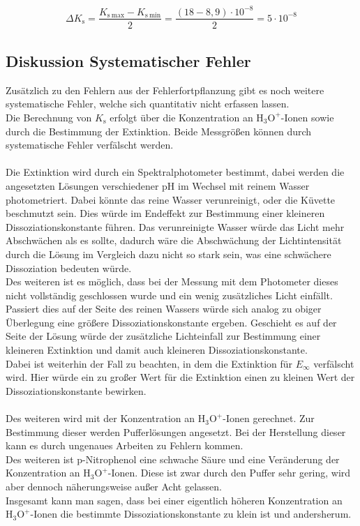\documentclass[12pt,a4paper,titlepage,headinclude,bibtotoc]{scrartcl}
\begin{document}
\begin{align}
\Delta K_{\mathrm{s}} = \dfrac{K_{\mathrm{s{~}max}}-K_{\mathrm{s{~}min}}}{2} = \dfrac{(18-8,9) \cdot 10^{-8}}{2}= 5\cdot 10^{-8}
\end{align}


\newpage
\subsection{Diskussion Systematischer Fehler}
Zusätzlich zu den Fehlern aus der Fehlerfortpflanzung gibt es noch weitere systematische Fehler, welche sich quantitativ nicht erfassen lassen.\\
Die Berechnung von $K_{\mathrm{s}}$ erfolgt über die Konzentration an $\mathrm{H_3 O^+}$-Ionen sowie durch die Bestimmung der Extinktion. Beide Messgrößen können durch systematische Fehler verfälscht werden.\\\\
Die Extinktion wird durch ein Spektralphotometer bestimmt, dabei werden die angesetzten Lösungen verschiedener pH im Wechsel mit reinem Wasser photometriert. Dabei könnte das reine Wasser verunreinigt, oder die Küvette beschmutzt sein. Dies würde im Endeffekt zur Bestimmung einer kleineren Dissoziationskonstante führen. Das verunreinigte Wasser würde das Licht mehr Abschwächen als es sollte, dadurch wäre die Abschwächung der Lichtintensität durch die Lösung im Vergleich dazu nicht so stark sein, was eine schwächere Dissoziation bedeuten würde.\\ Des weiteren ist es möglich, dass bei der Messung mit dem Photometer dieses nicht vollständig geschlossen wurde und ein wenig zusätzliches Licht einfällt. Passiert dies auf der Seite des reinen Wassers würde sich analog zu obiger Überlegung eine größere Dissoziationskonstante ergeben. Geschieht es auf der Seite der Lösung würde der zusätzliche Lichteinfall zur Bestimmung einer kleineren Extinktion und damit auch kleineren Dissoziationskonstante.\\ Dabei ist weiterhin der Fall zu beachten, in dem die Extinktion für $E_{\infty}$ verfälscht wird. Hier würde ein zu großer Wert für die Extinktion einen zu kleinen Wert der Dissoziationskonstante bewirken.\\\\
Des weiteren wird mit der Konzentration an $\mathrm{H_3 O^+}$-Ionen gerechnet. Zur Bestimmung dieser werden Pufferlösungen angesetzt. Bei der Herstellung dieser kann es durch ungenaues Arbeiten zu Fehlern kommen.\\ 
Des weiteren ist p-Nitrophenol eine schwache Säure und eine Veränderung der Konzentration an $\mathrm{H_3 O^+}$-Ionen. Diese ist zwar durch den Puffer sehr gering, wird aber dennoch näherungsweise außer Acht gelassen.\\
Insgesamt kann man sagen, dass bei einer eigentlich höheren Konzentration an $\mathrm{H_3 O^+}$-Ionen die bestimmte Dissoziationskonstante zu klein ist und andersherum.\\\\
     
\end{document}

